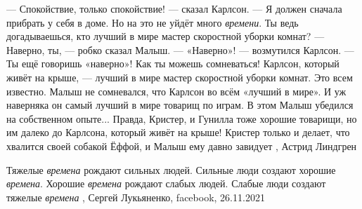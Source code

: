 — Спокойствие, только спокойствие! — сказал Карлсон. — Я должен сначала
прибрать у себя в доме. Но на это не уйдёт много \emph{времени}. Ты ведь
догадываешься, кто лучший в мире мастер скоростной уборки комнат?  — Наверно,
ты, — робко сказал Малыш.  — «Наверно»! — возмутился Карлсон. — Ты ещё говоришь
«наверно»! Как ты можешь сомневаться! Карлсон, который живёт на крыше, — лучший
в мире мастер скоростной уборки комнат. Это всем известно.  Малыш не
сомневался, что Карлсон во всём «лучший в мире». И уж наверняка он самый лучший
в мире товарищ по играм. В этом Малыш убедился на собственном опыте... Правда,
Кристер, и Гунилла тоже хорошие товарищи, но им далеко до Карлсона, который
живёт на крыше! Кристер только и делает, что хвалится своей собакой Ёффой, и
Малыш ему давно завидует
, Астрид Линдгрен

Тяжелые \emph{времена} рождают сильных людей.
Сильные люди создают хорошие \emph{времена}.
Хорошие \emph{времена} рождают слабых людей.
Слабые люди создают тяжелые \emph{времена}
, Сергей Лукьяненко, facebook, 26.11.2021

